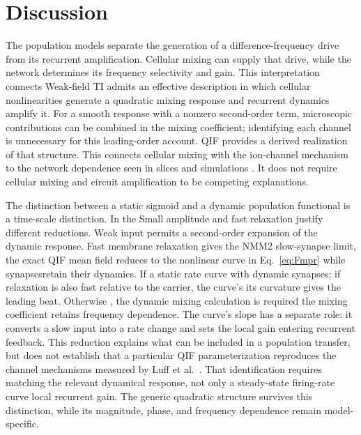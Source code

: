 \documentclass[11pt,a4paper]{article}
\providecommand{\DIFaddtex}[1]{{\protect\color{blue} \sf #1}} %
\providecommand{\DIFdeltex}[1]{{\protect\color{red} \scriptsize #1}} %
\providecommand{\DIFaddbegin}{} %
\providecommand{\DIFaddend}{} %
\providecommand{\DIFdelbegin}{} %
\providecommand{\DIFdelend}{} %
\providecommand{\DIFadd}[1]{\texorpdfstring{\DIFaddtex{#1}}{#1}} %
\providecommand{\DIFdel}[1]{\texorpdfstring{\DIFdeltex{#1}}{}} %
\begin{document}
\section{Discussion}\label{sec:discussion}
\DIFdelbegin \DIFdel{The population models separate the generation of a difference-frequency drive from
its recurrent amplification. Cellular mixing can supply that drive, while the network determines its frequency selectivity and gain. This interpretation connects }\DIFdelend \DIFaddbegin \DIFadd{Weak-field TI admits an effective description in which cellular nonlinearities
generate a quadratic mixing response and recurrent dynamics amplify it. For a
smooth response with a nonzero second-order term, microscopic contributions can
be combined in the mixing coefficient; identifying each channel is unnecessary
for this leading-order account. QIF provides a derived realization of that
structure. This connects cellular mixing \cite{mirzakhalili2020,luff2024mixer}
with }\DIFaddend the \DIFdelbegin \DIFdel{ion-channel mechanism \cite{mirzakhalili2020,luff2024mixer}
to the }\DIFdelend network dependence seen in slices and simulations
\cite{caldas2024,karimi2024,soroushi2025}.
\DIFdelbegin \DIFdel{It does not require cellular mixing and circuit amplification to be competing
explanations. }\DIFdelend

\DIFdelbegin \DIFdel{The distinction between a static sigmoid and a dynamic population functional is a
time-scale distinction. In the }\DIFdelend \DIFaddbegin \DIFadd{Small amplitude and fast relaxation justify different reductions. Weak input
permits a second-order expansion of the dynamic response. Fast membrane
relaxation gives the NMM2 }\DIFaddend slow-synapse limit, \DIFdelbegin \DIFdel{the exact QIF mean field reduces
to the nonlinear curve in Eq.~\eqref{eq:Fmpr} while synapsesretain their dynamics.
If }\DIFdelend \DIFaddbegin \DIFadd{a static rate curve with dynamic
synapses; if }\DIFaddend relaxation is also fast relative to the carrier, \DIFdelbegin \DIFdel{the curve's }\DIFdelend \DIFaddbegin \DIFadd{its }\DIFaddend curvature
gives the leading beat. Otherwise \DIFdelbegin \DIFdel{, the dynamic mixing calculation is required}\DIFdelend \DIFaddbegin \DIFadd{the mixing coefficient retains frequency
dependence}\DIFaddend . The curve's slope \DIFdelbegin \DIFdel{has a separate role: it }\DIFdelend converts a slow input into a rate change and sets
\DIFdelbegin \DIFdel{the local gain entering recurrent feedback. This reduction explains what
can be included in a population transfer,
but does not establish that a particular
QIF parameterization reproduces the channel mechanisms measured by Luff et al.\
\cite{luff2024mixer}. That identification requires matching the relevant dynamical
response, not only a steady-state firing-rate curve}\DIFdelend \DIFaddbegin \DIFadd{local recurrent gain. The generic quadratic structure survives this distinction,
while its magnitude, phase, and frequency dependence remain model-specific}\DIFaddend .
\end{document}
